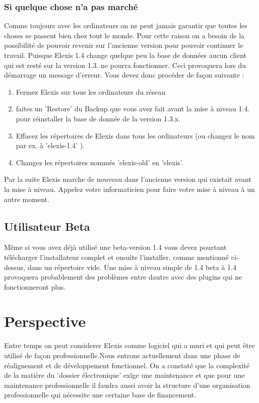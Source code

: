 \documentclass[a4paper]{scrartcl}
\begin{document}
\subsubsection{Si quelque chose n'a pas marché}
Comme toujours avec les ordinateurs on ne peut jamais garantir que toutes les choses se passent bien chez tout le monde. Pour cette raison on a besoin de la possibilité de pouvoir revenir sur l'ancienne version pour pouvoir continuer le travail. Puisque Elexis 1.4 change quelque peu la base de données aucun client qui est resté sur la version 1.3. ne pourra fonctionner. Ceci provoquera lors du démarrage un message d'erreur. Vous devez donc procéder de façon suivante :
\begin{enumerate}
\item Fermez Elexis sur tous les ordinateurs du réseau
\item faites un 'Restore' du Backup que vous avez fait avant la mise à niveau 1.4. pour réinstaller la base de donnée de la version 1.3.x.
\item Effacez les répertoires de Elexis dans tous les ordinateurs (ou changez le nom par ex. à 'elexis-1.4' ).
\item Changez les répertoires nommés 'elexis-old' en 'elexis'.

\end{enumerate}
Par la suite Elexis marche de nouveau dans l'ancienne version qui existait avant la mise à niveau. Appelez votre informaticien pour faire votre mise à niveau à un autre moment. 

\subsection{Utilisateur Beta}
Même si vous avez déjà utilisé une beta-version 1.4 vous devez pourtant télécharger l'installateur complet et ensuite l'installer, comme mentionné ci-dessus, dans un répertoire vide. Une mise à niveau simple de 1.4 beta à 1.4 provoquera probablement des problèmes entre dautre avec des plugins qui ne fonctionneront plus. 

\section{Perspective}
Entre temps on peut considerer Elexis  comme logiciel qui a muri et qui peut être utilisé de façon professionnelle.Nous entrons actuellement dans une phase de réalignement et de développement fonctionnel. On a constaté que la complexité de la matière du 'dossier électronique' exîge une maintenance et que pour une maintenance professionnelle il faudra aussi avoir la structure d'une organisation professionnelle qui nécessite une certaine base de financement. 
\end{document}
